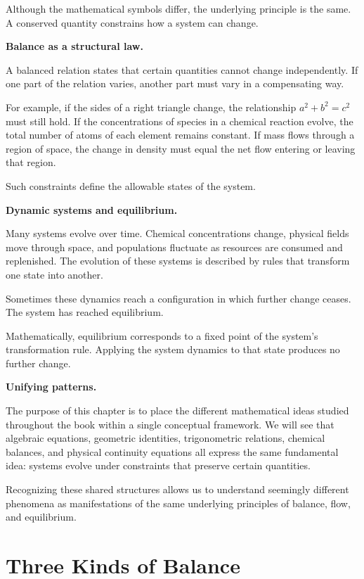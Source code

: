 \documentclass[11pt, openany]{book}
\theoremstyle{plain}
\theoremstyle{definition}
\theoremstyle{remark}
\begin{document}
Although the mathematical symbols differ, the underlying principle is
the same. A conserved quantity constrains how a system can change.

\medskip

\textbf{Balance as a structural law.}

A balanced relation states that certain quantities cannot change
independently. If one part of the relation varies, another part must vary
in a compensating way.

For example, if the sides of a right triangle change, the relationship
$a^2+b^2=c^2$ must still hold. If the concentrations of species in a
chemical reaction evolve, the total number of atoms of each element
remains constant. If mass flows through a region of space, the change in
density must equal the net flow entering or leaving that region.

Such constraints define the allowable states of the system.

\medskip

\textbf{Dynamic systems and equilibrium.}

Many systems evolve over time. Chemical concentrations change, physical
fields move through space, and populations fluctuate as resources are
consumed and replenished. The evolution of these systems is described by
rules that transform one state into another.

Sometimes these dynamics reach a configuration in which further change
ceases. The system has reached equilibrium.

Mathematically, equilibrium corresponds to a fixed point of the system's
transformation rule. Applying the system dynamics to that state produces
no further change.

\medskip

\textbf{Unifying patterns.}

The purpose of this chapter is to place the different mathematical ideas
studied throughout the book within a single conceptual framework. We
will see that algebraic equations, geometric identities, trigonometric
relations, chemical balances, and physical continuity equations all
express the same fundamental idea: systems evolve under constraints that
preserve certain quantities.

Recognizing these shared structures allows us to understand seemingly
different phenomena as manifestations of the same underlying principles
of balance, flow, and equilibrium.

\section{Three Kinds of Balance}
\end{document}
